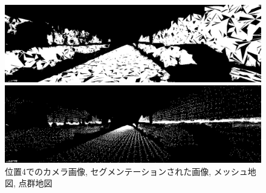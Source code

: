 \begin{figure}[htbp]
\begin{minipage}[b]{0.50\hsize}
\begin{center}
  \end{center}
 \end{minipage}\\
  \begin{minipage}[b]{0.50\hsize}
 \begin{center}
  \includegraphics[keepaspectratio, scale=0.18]{./picture/valued_mesh_map_image/image3.jpg}
  \end{center}
 \end{minipage}
 \begin{minipage}[b]{0.50\hsize}
 \begin{center}
  \includegraphics[keepaspectratio, scale=0.18]{./picture/valued_point_map_image/image3.jpg}
  \end{center}
 \end{minipage}
 \caption{位置4でのカメラ画像, セグメンテーションされた画像, メッシュ地図, 点群地図}\label{fig:place4}
\end{figure}


